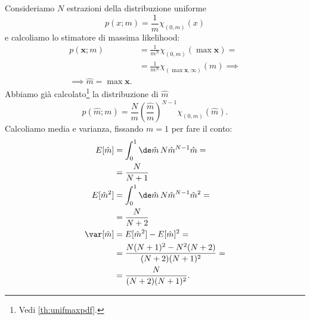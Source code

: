 \begin{example}
	Consideriamo $N$ estrazioni della distribuzione uniforme
	\begin{equation*}
		p(x;m) = \frac 1m \chi_{(0,m)}(x)
	\end{equation*}
	e calcoliamo lo stimatore di massima likelihood:
	\begin{align*}
		p(\mathbf x;m)
		&= \frac1{m^N} \chi_{(0,m)}(\max\mathbf x) = \\
		&= \frac1{m^N} \chi_{(\max\mathbf x,\infty)}(m) \implies \\
		\implies \hat m=\max\mathbf x.
	\end{align*}
	Abbiamo già calcolato\footnote{Vedi \autoref{th:unifmaxpdf}.} la distribuzione di $\hat m$
	\begin{equation*}
		p(\hat m;m)
		= \frac Nm \left(\frac{\hat m}m\right)^{N-1} \chi_{(0,m)}(\hat m).
	\end{equation*}
	Calcoliamo media e varianza, fissando $m=1$ per fare il conto:
	\begin{align*}
		E[\hat m]
		&= \int_0^1 \de\hat m\, N \hat m^{N-1} \hat m = \\
		&= \frac N{N+1} \\
		E[\hat m^2]
		&= \int_0^1 \de\hat m\, N \hat m^{N-1} \hat m^2 = \\
		&= \frac N{N+2} \\
		\var[\hat m]
		&= E[\hat m^2] - E[\hat m]^2 = \\
		&= \frac{N(N+1)^2 - N^2(N+2)}{(N+2)(N+1)^2} = \\
		&= \frac N{(N+2)(N+1)^2}.
	\end{align*}
\end{example}
